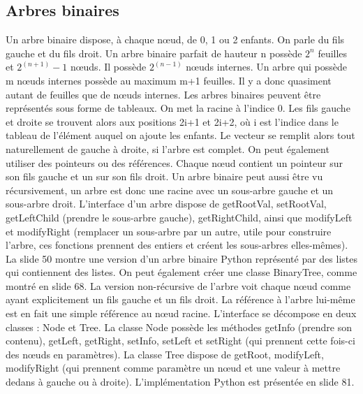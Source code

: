 \documentclass[10pt]{article}
\begin{document}
\subsection{Arbres binaires}
Un arbre binaire dispose, à chaque nœud, de 0, 1 ou 2 enfants. On parle du fils gauche et du fils droit. Un arbre binaire parfait de hauteur n possède $2^n$ feuilles et $2^(n+1)-1$ nœuds. Il possède $2^(n-1)$ nœuds internes. Un arbre qui possède m nœuds internes possède au maximum m+1 feuilles. Il y a donc quasiment autant de feuilles que de nœuds internes.  
\newline \newline 
Les arbres binaires peuvent être représentés sous forme de tableaux. On met la racine à l'indice 0. Les fils gauche et droite se trouvent alors aux positions 2i+1 et 2i+2, où i est l'indice dans le tableau de l'élément auquel on ajoute les enfants. Le vecteur se remplit alors tout naturellement de gauche à droite, si l'arbre est complet. 
\newline \newline 
On peut également utiliser des pointeurs ou des références. Chaque nœud contient un pointeur sur son fils gauche et un sur son fils droit. Un arbre binaire peut aussi être vu récursivement, un arbre est donc une racine avec un sous-arbre gauche et un sous-arbre droit. 
\newline \newline 
L'interface d'un arbre dispose de getRootVal, setRootVal, getLeftChild (prendre le sous-arbre gauche), getRightChild, ainsi que modifyLeft et modifyRight (remplacer un sous-arbre par un autre, utile pour construire l'arbre, ces fonctions prennent des entiers et créent les sous-arbres elles-mêmes). La slide 50 montre une version d'un arbre binaire Python représenté par des listes qui contiennent des listes. 
\newline \newline 
On peut également créer une classe BinaryTree, comme montré en slide 68.  
\newline \newline 
La version non-récursive de l'arbre voit chaque nœud comme ayant explicitement un fils gauche et un fils droit. La référence à l'arbre lui-même est en fait une simple référence au nœud racine.  
\newline \newline 
L'interface se décompose en deux classes : Node et Tree. La classe Node possède les méthodes getInfo (prendre son contenu), getLeft, getRight, setInfo, setLeft et setRight (qui prennent cette fois-ci des nœuds en paramètres). La classe Tree dispose de getRoot, modifyLeft, modifyRight (qui prennent comme paramètre un nœud et une valeur à mettre dedans à gauche ou à droite). L'implémentation Python est présentée en slide 81. 
\end{document}
